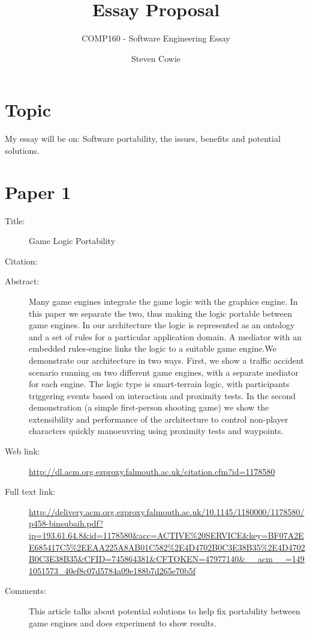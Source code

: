 \documentclass{scrartcl}
\title{Essay Proposal}
\subtitle{COMP160 - Software Engineering Essay}
\author{Steven Cowie}
\begin{document}
\maketitle

\section*{Topic}

My essay will be on: Software portability, the issues, benefits and potential solutions.


\section*{Paper 1}
\begin{description}
\item[Title:] Game Logic Portability
\item[Citation:] \cite{binsubaih2005game}
\item[Abstract:] Many game engines integrate the game logic with the graphics engine. In this paper we separate the two, thus making the logic portable between game engines. In our architecture the logic is represented as an ontology and a set of rules for a particular application domain. A mediator with an embedded rules-engine links the logic to a suitable game engine.We demonstrate our architecture in two ways. First, we show a traffic accident scenario running on two different game engines, with a separate mediator for each engine. The logic type is smart-terrain logic, with participants triggering events based on interaction and proximity tests. In the second demonstration (a simple first-person shooting game) we show the extensibility and performance of the architecture to control non-player characters quickly manoeuvring using proximity tests and waypoints.
\item[Web link:] \url{http://dl.acm.org.ezproxy.falmouth.ac.uk/citation.cfm?id=1178580}
\item[Full text link:] \url{http://delivery.acm.org.ezproxy.falmouth.ac.uk/10.1145/1180000/1178580/p458-binsubaih.pdf?ip=193.61.64.8&id=1178580&acc=ACTIVE%20SERVICE&key=BF07A2EE685417C5%2EEAA225A8AB01C582%2E4D4702B0C3E38B35%2E4D4702B0C3E38B35&CFID=745864381&CFTOKEN=47977140&__acm__=1491051573_40ef8c07d5784a09e188b7d265e70b5f}
\item[Comments:] This article talks about potential solutions to help fix portability between game engines  and does experiment to show results.
\end{description}
\end{document}
